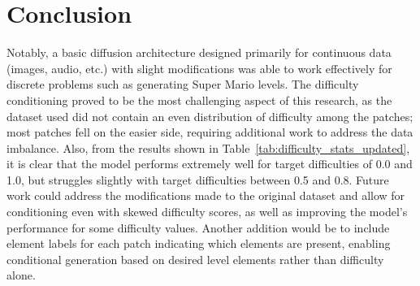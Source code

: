 \documentclass[conference]{IEEEtran}
\begin{document}
\section{Conclusion}
Notably, a basic diffusion architecture designed primarily for continuous data (images, audio, etc.) with slight modifications was able to work effectively for discrete problems such as generating Super Mario levels. The difficulty conditioning proved to be the most challenging aspect of this research, as the dataset used did not contain an even distribution of difficulty among the patches; most patches fell on the easier side, requiring additional work to address the data imbalance. Also, from the results shown in Table~\ref{tab:difficulty_stats_updated}, it is clear that the model performs extremely well for target difficulties of 0.0 and 1.0, but struggles slightly with target difficulties between 0.5 and 0.8. Future work could address the modifications made to the original dataset and allow for conditioning even with skewed difficulty scores, as well as improving the model's performance for some difficulty values. Another addition would be to include element labels for each patch indicating which elements are present, enabling conditional generation based on desired level elements rather than difficulty alone.
\end{document}
